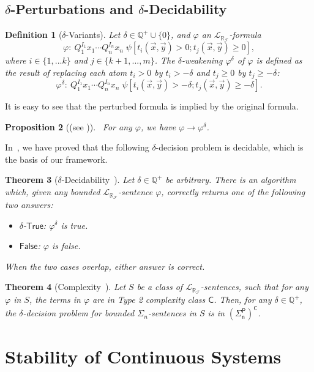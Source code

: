 \documentclass[10pt]{article}
\theoremstyle{plain}
\newtheorem{theorem}{Theorem}[section]
\newtheorem{proposition}[theorem]{Proposition}
\newtheorem{definition}[theorem]{Definition}
\theoremstyle{definition}
\newcommand{\lrf}{\mathcal{L}_{\mathbb{R}_{\mathcal{F}}}}
\begin{document}
\subsection{$\delta$-Perturbations and $\delta$-Decidability}
\begin{definition}[$\delta$-Variants]\label{variants}
Let $\delta\in \mathbb{Q}^+\cup\{0\}$, and $\varphi$ an
$\lrf$-formula
$$\varphi: \ Q_1^{I_1}x_1\cdots Q_n^{I_n}x_n\;\psi[t_i(\vec x, \vec y)>0;
t_j(\vec x, \vec
y)\geq 0],$$ where $i\in\{1,...k\}$ and $j\in\{k+1,...,m\}$. The {\em
$\delta$-weakening} $\varphi^{\delta}$ of $\varphi$ is
defined as the result of replacing each atom $t_i > 0$ by $t_i >
-\delta$ and $t_j \geq 0$ by $t_j \geq -\delta$:
$$\varphi^{\delta}:\ Q_1^{I_1}x_1\cdots Q_n^{I_n}x_n\;\psi[t_i(\vec x, \vec
y)>-\delta; t_j(\vec x,
\vec y)\geq -\delta].$$
\end{definition}
It is easy to see that the perturbed formula is implied by the original formula. 
\begin{proposition}[(see \cite{DBLP:conf/lics/GaoAC12})]~\label{overap}
For any $\varphi$, we have $\varphi\rightarrow\varphi^{\delta}$.
\end{proposition}
In~\cite{DBLP:conf/lics/GaoAC12,DBLP:conf/cade/GaoAC12}, we have proved that the following $\delta$-decision problem is decidable, which is the basis of our framework.
\begin{theorem}[$\delta$-Decidability~\cite{DBLP:conf/lics/GaoAC12}]\label{delta-decide} Let $\delta\in\mathbb{Q}^+$ be
arbitrary. There is an algorithm which, given any bounded $\lrf$-sentence $\varphi$,
correctly returns one of the following two answers:
\begin{itemize}
\item $\delta$-$\mathsf{True}$: $\varphi^{\delta}$ is true.
\item $\mathsf{False}$: $\varphi$ is false.
\end{itemize}
When the two cases overlap, either answer is correct.
\end{theorem}
\begin{theorem}[Complexity~\cite{DBLP:conf/lics/GaoAC12}]\label{compmain}
Let $S$ be a class of $\lrf$-sentences, such that for any $\varphi$ in $S$, the terms in $\varphi$ are in Type 2 complexity class $\mathsf{C}$. Then, for any $\delta\in \mathbb{Q}^+$, the $\delta$-decision problem for bounded $\Sigma_n$-sentences in $S$ is in $\mathsf{(\Sigma_n^P)^C}$.
\end{theorem}

\section{Stability of Continuous Systems}
\end{document}

